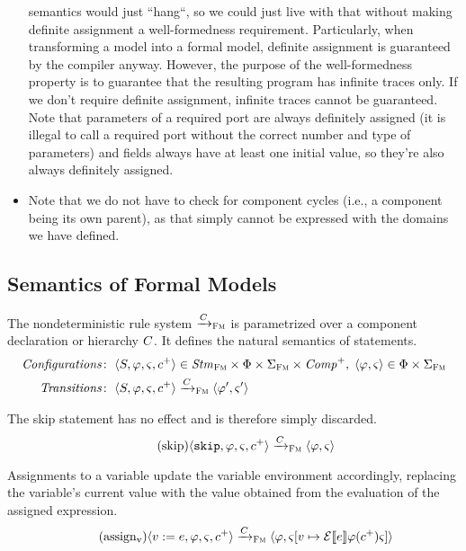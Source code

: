 \documentclass[a4paper,10pt,english]{article}
\begin{document}
\begin{itemize}
	semantics would just ``hang``, so we could just live with that without making definite assignment a well-formedness requirement.
	Particularly, when transforming a \SSharp model into a formal model, definite assignment is guaranteed by the \CSharp compiler
	anyway. However, the purpose of the well-formedness property is to guarantee that the resulting \Fil program
	has infinite traces only. If we don't require definite assignment, infinite traces cannot be guaranteed. Note that parameters
	of a required port are always definitely assigned (it is illegal to call a required port without the correct number and type of
	parameters) and fields always have at least one initial value, so they're also always definitely assigned.
	\item Note that we do not have to check for component cycles (i.e., a component being its own parent), as that simply cannot be
	expressed with the domains we have defined.
\end{itemize}

\subsection{Semantics of Formal Models}
The nondeterministic rule system $\xrightarrow{C}_\textsc{Fm}$ is parametrized over a component declaration or hierarchy $C$. It defines
the natural semantics of statements.
\begin{align*}
	\mathit{Configurations} \colon & \;\langle S, \varphi, \varsigma, c^+ \rangle \in \mathit{Stm}_\textsc{Fm} \times \Phi \times
	\Sigma_\textsc{Fm} \times \mathit{Comp}^+, \; \langle \varphi, \varsigma \rangle \in \Phi \times \Sigma_\textsc{Fm}
	\\
	\mathit{Transitions} \colon & \;\langle S, \varphi, \varsigma, c^+ \rangle \xrightarrow{C}_\textsc{Fm}
	\langle \varphi', \varsigma' \rangle
\end{align*}

The skip statement has no effect and is therefore simply discarded.
\begin{equation*}
	\tag{skip}
	\langle \mathtt{skip}, \varphi, \varsigma, c^+ \rangle
		\xrightarrow{C}_\textsc{Fm}
	\langle \varphi, \varsigma \rangle
\end{equation*}

Assignments to a variable update the variable environment accordingly, replacing the variable's current value with the value
obtained from the evaluation of the assigned expression.
\begin{equation*}
	\tag{assign${}_\text{v}$}
	\configurationFm{\assignVarStm{\var}{\expr}, \fieldEnv, \varEnvFm, \toListNE{\comp}}
		\stmArrowFm
	\configurationFm{\fieldEnv, \varEnvFm[\var \mapsto \ExprSem{\expr} \fieldEnv(\toListNE{\comp}) \varEnvFm]}
\end{equation*}
\end{document}
